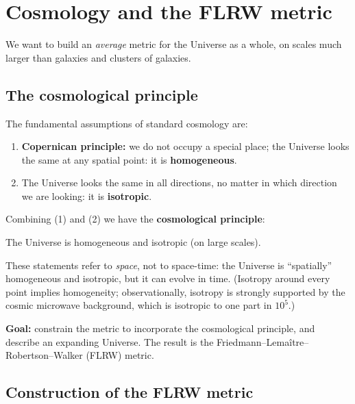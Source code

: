 \chapter{Cosmology and the FLRW metric}\label{ch:cosmology}

We want to build an \emph{average} metric for the Universe as a whole, on scales much larger than galaxies and clusters of galaxies.

\section{The cosmological principle}

The fundamental assumptions of standard cosmology are:
\begin{enumerate}
\item \textbf{Copernican principle:} we do not occupy a special place; the Universe looks the same at any spatial point: it is \textbf{homogeneous}.
\item The Universe looks the same in all directions, no matter in which direction we are looking: it is \textbf{isotropic}.
\end{enumerate}
Combining (1) and (2) we have the \textbf{cosmological principle}:
\begin{keyresult}
The Universe is homogeneous and isotropic (on large scales).
\end{keyresult}
These statements refer to \emph{space}, not to space-time: the Universe is ``spatially'' homogeneous and isotropic, but it can evolve in time. (Isotropy around every point implies homogeneity; observationally, isotropy is strongly supported by the cosmic microwave background, which is isotropic to one part in $10^5$.)

\textbf{Goal:} constrain the metric to incorporate the cosmological principle, and describe an expanding Universe. The result is the Friedmann--Lemaître--Robertson--Walker (FLRW) metric.

\section{Construction of the FLRW metric}

